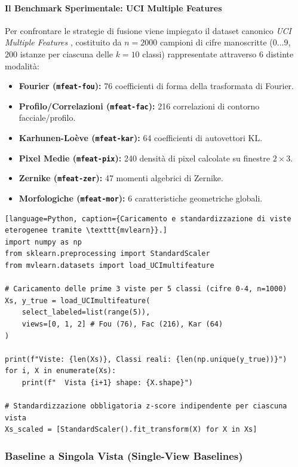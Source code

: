 \paragraph{Il Benchmark Sperimentale: UCI Multiple Features}
Per confrontare le strategie di fusione viene impiegato il dataset canonico \textit{UCI Multiple Features} \cite{perry2021}, costituito da $n = 2000$ campioni di cifre manoscritte ($0 \dots 9$, $200$ istanze per ciascuna delle $k=10$ classi) rappresentate attraverso 6 distinte modalità:
\begin{itemize}
    \item \textbf{Fourier (\texttt{mfeat-fou}):} 76 coefficienti di forma della trasformata di Fourier.
    \item \textbf{Profilo/Correlazioni (\texttt{mfeat-fac}):} 216 correlazioni di contorno facciale/profilo.
    \item \textbf{Karhunen-Lo{\`e}ve (\texttt{mfeat-kar}):} 64 coefficienti di autovettori KL.
    \item \textbf{Pixel Medie (\texttt{mfeat-pix}):} 240 densità di pixel calcolate su finestre $2 \times 3$.
    \item \textbf{Zernike (\texttt{mfeat-zer}):} 47 momenti algebrici di Zernike.
    \item \textbf{Morfologiche (\texttt{mfeat-mor}):} 6 caratteristiche geometriche globali.
\end{itemize}

\begin{lstlisting}[language=Python, caption={Caricamento e standardizzazione di viste eterogenee tramite \texttt{mvlearn}}.]
import numpy as np
from sklearn.preprocessing import StandardScaler
from mvlearn.datasets import load_UCImultifeature

# Caricamento delle prime 3 viste per 5 classi (cifre 0-4, n=1000)
Xs, y_true = load_UCImultifeature(
    select_labeled=list(range(5)),
    views=[0, 1, 2] # Fou (76), Fac (216), Kar (64)
)

print(f"Viste: {len(Xs)}, Classi reali: {len(np.unique(y_true))}")
for i, X in enumerate(Xs):
    print(f"  Vista {i+1} shape: {X.shape}")

# Standardizzazione obbligatoria z-score indipendente per ciascuna vista
Xs_scaled = [StandardScaler().fit_transform(X) for X in Xs]
\end{lstlisting}

\FloatBarrier
\subsubsection{Baseline a Singola Vista (Single-View Baselines)}
\label{subsec:lab-single-view}

